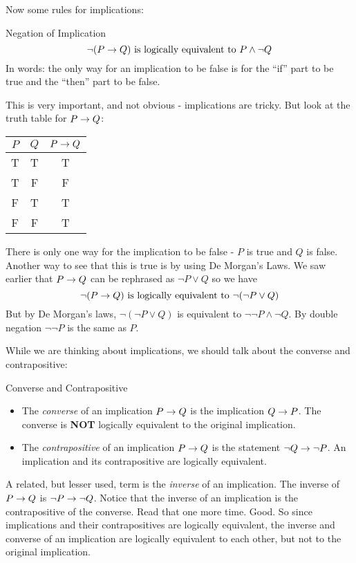 \documentclass[12pt]{article}
\begin{document}
Now some rules for implications:

\begin{defbox}{Negation of Implication}
  \[\neg(P \rightarrow Q) \mbox{ is logically equivalent to } P \wedge \neg Q\]
  In words: the only way for an implication to be false is for the ``if'' part to be true and the ``then'' part to be false.
\end{defbox}

This is very important, and not obvious - implications are tricky.  But look at the truth table for $P \rightarrow Q$:

\begin{center}
\begin{tabular}{c|c|c}
 $P$ & $Q$ & $P\rightarrow Q$ \\ \hline
 T & T & T\\
 T & F & F\\
 F & T & T\\
 F & F & T
\end{tabular}
\end{center}

There is only one way for the implication to be false - $P$ is true and $Q$ is false.  Another way to see that this is true is by using De Morgan's Laws.  We saw earlier that $P \rightarrow Q$ can be rephrased as $\neg P \vee Q$ so we have
\[\neg (P \rightarrow Q) \mbox{ is logically equivalent to } \neg( \neg P \vee Q)\]
But by De Morgan's laws, $\neg( \neg P \vee Q)$ is equivalent to $\neg \neg P \wedge \neg Q$.  By double negation $\neg \neg P$ is the same as $P$.

While we are thinking about implications, we should talk about the converse and contrapositive:

\begin{defbox}{Converse and Contrapositive}
  \begin{itemize}
    \item The {\em converse} of an implication $P \rightarrow Q$ is the implication $Q \rightarrow P$.  The converse is \textbf{NOT} logically equivalent to the original implication.
    \item The {\em contrapositive} of an implication $P \rightarrow Q$ is the statement $\neg Q \rightarrow \neg P$.  An implication and its contrapositive are logically equivalent.
  \end{itemize}

\end{defbox}

A related, but lesser used, term is the {\em inverse} of an implication.  The inverse of $P \rightarrow Q$ is $\neg P \rightarrow \neg Q$.  Notice that the inverse of an implication is the contrapositive of the converse.  Read that one more time.   Good.  So since implications and their contrapositives are logically equivalent, the inverse and converse of an implication are logically equivalent to each other, but not to the original implication.
\end{document}
